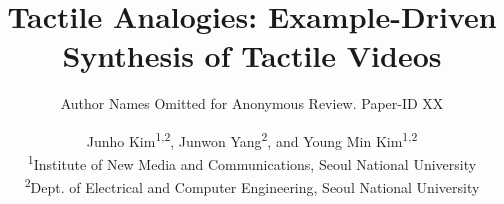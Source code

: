 \documentclass[conference]{IEEEtran}
\begin{document}
\title{Tactile Analogies: Example-Driven Synthesis of Tactile Videos}

\author{Author Names Omitted for Anonymous Review. Paper-ID XX}

\author{Junho Kim\textsuperscript{1,2}, Junwon Yang\textsuperscript{2}, and Young Min Kim\textsuperscript{1,2} \\
\textsuperscript{1}{\small Institute of New Media and Communications, Seoul National University} \\
\textsuperscript{2}{\small Dept. of Electrical and Computer Engineering, Seoul National University}
}
\fi

\maketitle








\IEEEpeerreviewmaketitle



\end{document}
